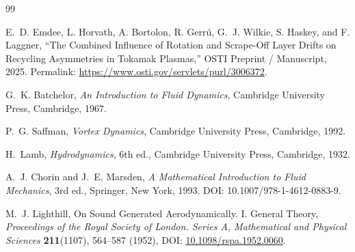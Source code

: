 \documentclass[11pt]{article}
\begin{document}
        \begin{thebibliography}{99}
            
            E.~D. Emdee, L. Horvath, A. Bortolon, R. Gerr\'u, G.~J. Wilkie, S. Haskey, and F. Laggner,
            \newblock ``The Combined Influence of Rotation and Scrape-Off Layer Drifts on Recycling Asymmetries in Tokamak Plasmas,''
            \newblock OSTI Preprint / Manuscript, 2025.
            \newblock Permalink: \url{https://www.osti.gov/servlets/purl/3006372}.
            
            G.~K. Batchelor,
            \newblock \emph{An Introduction to Fluid Dynamics},
            \newblock Cambridge University Press, Cambridge, 1967.
            
            P.~G. Saffman,
            \newblock \emph{Vortex Dynamics},
            \newblock Cambridge University Press, Cambridge, 1992.
            
            H.~Lamb,
            \newblock \emph{Hydrodynamics},
            \newblock 6th ed., Cambridge University Press, Cambridge, 1932.
            
            A.~J. Chorin and J.~E. Marsden,
            \newblock \emph{A Mathematical Introduction to Fluid Mechanics},
            \newblock 3rd ed., Springer, New York, 1993.
            \newblock DOI: 10.1007/978-1-4612-0883-9.
        
            M.~J. Lighthill,
            \newblock On Sound Generated Aerodynamically. I. General Theory,
            \newblock \emph{Proceedings of the Royal Society of London. Series A, Mathematical and Physical Sciences}
            \textbf{211}(1107), 564--587 (1952),
            \newblock DOI: \href{https://doi.org/10.1098/rspa.1952.0060}{10.1098/rspa.1952.0060}.

        \end{thebibliography}
\end{document}
